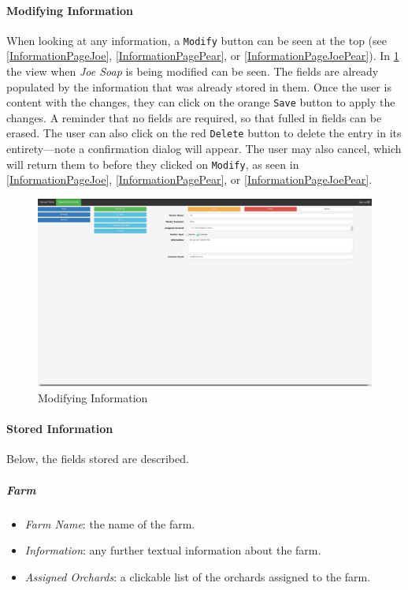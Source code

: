 \documentclass[11pt]{article}
\begin{document}
\paragraph{Modifying Information}When looking at any information, a \texttt{Modify} button can be seen at the top (see \ref{InformationPageJoe}, \ref{InformationPagePear}, or \ref{InformationPageJoePear}). In \ref{InformationModJoe} the view when \textit{Joe Soap} is being modified can be seen. The fields are already populated by the information that was already stored in them. Once the user is content with the changes, they can click on the orange \texttt{Save} button to apply the changes. A reminder that no fields are required, so that fulled in fields can be erased. The user can also click on the red \texttt{Delete} button to delete the entry in its entirety---note a confirmation dialog will appear. The user may also cancel, which will return them to before they clicked on \texttt{Modify}, as seen in \ref{InformationPageJoe}, \ref{InformationPagePear}, or \ref{InformationPageJoePear}.

\begin{figure}
 \centering
 \includegraphics[width=12cm, keepaspectratio]{Images/Information-Mod-Joe.png}
 \caption{Modifying Information}
 \label{InformationModJoe}
\end{figure}

\paragraph{Stored Information}
Below, the fields stored are described.
\subparagraph{Farm}
\begin{itemize}
 \item \textit{Farm Name}: the name of the farm.
 \item \textit{Information}: any further textual information about the farm.
 \item \textit{Assigned Orchards}: a clickable list of the orchards assigned to the farm.
\end{itemize}
\end{document}
